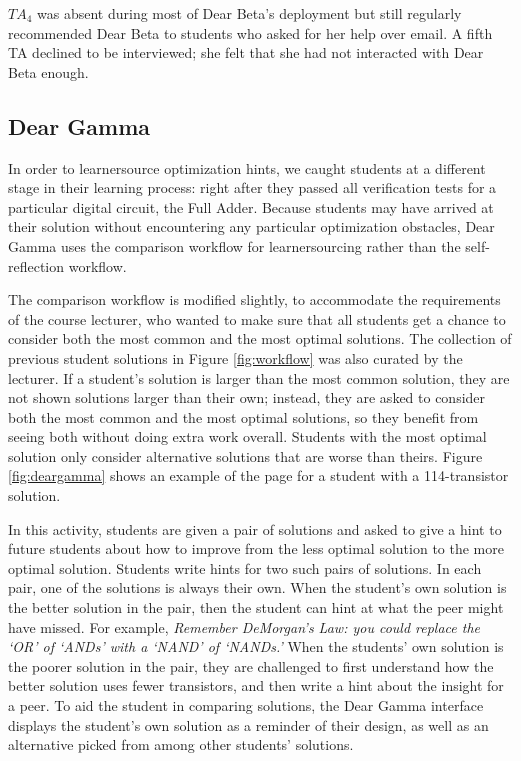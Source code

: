 $TA_{4}$ was absent during most of Dear Beta's deployment but still regularly recommended Dear Beta to students who asked for her help over email. A fifth TA declined to be interviewed; she felt that she had not interacted with Dear Beta enough.

\subsection{Dear Gamma}

In order to learnersource optimization hints, we caught students at a different stage in their learning process: right after they passed all verification tests for a particular digital circuit, the Full Adder. Because students may have arrived at their solution without encountering any particular optimization obstacles, Dear Gamma uses the comparison workflow for learnersourcing rather than the self-reflection workflow. 

The comparison workflow is modified slightly, to accommodate the requirements of the course lecturer, who wanted to make sure that all students get a chance to consider both the most common and the most optimal solutions. The collection of previous student solutions in Figure \ref{fig:workflow} was also curated by the lecturer. If a student's solution is larger than the most common solution, they are not shown solutions larger than their own; instead, they are asked to consider both the most common and the most optimal solutions, so they benefit from seeing both without doing extra work overall. Students with the most optimal solution only consider alternative solutions that are worse than theirs. Figure \ref{fig:deargamma} shows an example of the page for a student with a 114-transistor solution.

In this activity, students are given a pair of solutions and asked to give a hint to future students about how to improve from the less optimal solution to the more optimal solution. Students write hints for two such pairs of solutions. In each pair, one of the solutions is always their own. When the student's own solution is the better solution in the pair, then the student can hint at what the peer might have missed. For example, {\it Remember DeMorgan's Law: you could replace the `OR' of `ANDs' with a `NAND' of `NANDs.'} When the students' own solution is the poorer solution in the pair, they are challenged to first understand how the better solution uses fewer transistors, and then write a hint about the insight for a peer. To aid the student in comparing solutions, the Dear Gamma interface displays the student's own solution as a reminder of their design, as well as an alternative picked from among other students' solutions.

